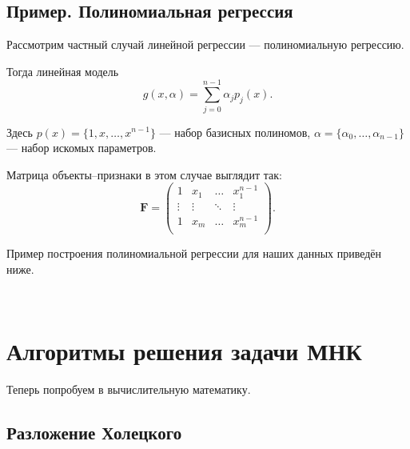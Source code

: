 \documentclass[11pt,a4paper]{article}
\begin{document}
    \hypertarget{ux43fux440ux438ux43cux435ux440.-ux43fux43eux43bux438ux43dux43eux43cux438ux430ux43bux44cux43dux430ux44f-ux440ux435ux433ux440ux435ux441ux441ux438ux44f}{%
\subsection{Пример. Полиномиальная
регрессия}\label{ux43fux440ux438ux43cux435ux440.-ux43fux43eux43bux438ux43dux43eux43cux438ux430ux43bux44cux43dux430ux44f-ux440ux435ux433ux440ux435ux441ux441ux438ux44f}}

Рассмотрим частный случай линейной регрессии --- полиномиальную
регрессию.

Тогда линейная модель
\[ g(x, \alpha) = \sum_{j=0}^{n-1} \alpha_j p_j(x).\]

Здесь \(p(x) = \{1, x, \ldots, x^{n-1}\}\) --- набор базисных полиномов,
\(\alpha = \{\alpha_0, \ldots, \alpha_{n-1}\}\) --- набор искомых
параметров.

Матрица объекты--признаки в этом случае выглядит так: \[
  \mathbf{F} = 
  \begin{pmatrix}
    1      & x_1    & \ldots & x_1^{n-1} \\
    \vdots & \vdots & \ddots & \vdots    \\
    1      & x_m    & \ldots & x_m^{n-1} \\
  \end{pmatrix}.
\]

Пример построения полиномиальной регрессии для наших данных приведён
ниже.

    \begin{center}
    \end{center}
    { \hspace*{\fill} \\}
    
    \hypertarget{ux430ux43bux433ux43eux440ux438ux442ux43cux44b-ux440ux435ux448ux435ux43dux438ux44f-ux437ux430ux434ux430ux447ux438-ux43cux43dux43a}{%
\section{Алгоритмы решения задачи
МНК}\label{ux430ux43bux433ux43eux440ux438ux442ux43cux44b-ux440ux435ux448ux435ux43dux438ux44f-ux437ux430ux434ux430ux447ux438-ux43cux43dux43a}}

Теперь попробуем в вычислительную математику.

\hypertarget{ux440ux430ux437ux43bux43eux436ux435ux43dux438ux435-ux445ux43eux43bux435ux446ux43aux43eux433ux43e}{%
\subsection{Разложение
Холецкого}\label{ux440ux430ux437ux43bux43eux436ux435ux43dux438ux435-ux445ux43eux43bux435ux446ux43aux43eux433ux43e}}
\end{document}

